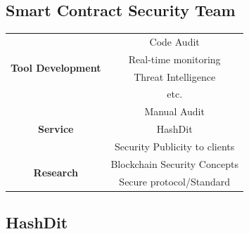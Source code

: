 \documentclass[a0,portrait]{a0poster}
\begin{document}
\begin{multicols}{2} %


\section{Smart Contract Security Team}
\large
\begin{table}[H]
\centering
\begin{tabular}{|c|c|}
\hline
\multirow{4}{*}{\textbf{Tool Development}} & Code Audit                    \\ \cline{2-2} 
                                           & Real-time monitoring          \\ \cline{2-2} 
                                           & Threat Intelligence           \\ \cline{2-2} 
                                           & etc.                          \\ \hline
\multirow{3}{*}{\textbf{Service}}          & Manual Audit                  \\ \cline{2-2} 
                                           & HashDit                       \\ \cline{2-2} 
                                           & Security Publicity to clients \\ \hline
\multirow{2}{*}{\textbf{Research}}         & Blockchain Security Concepts  \\ \cline{2-2} 
                                           & Secure protocol/Standard      \\ \hline
\end{tabular}
\end{table}
\subsection{HashDit}



\end{multicols}
\end{document}
